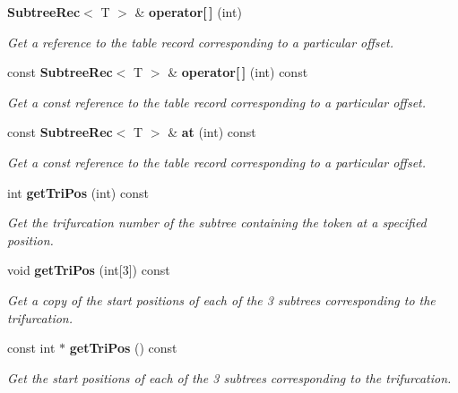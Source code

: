 \begin{CompactItemize}
{\bf Subtree\-Rec}$<$ T $>$ \& {\bf operator[$\,$]} (int)
\begin{CompactList}\small\item\em Get a reference to the table record corresponding to a particular offset. \item\end{CompactList}\item 
const {\bf Subtree\-Rec}$<$ T $>$ \& {\bf operator[$\,$]} (int) const 
\begin{CompactList}\small\item\em Get a const reference to the table record corresponding to a particular offset. \item\end{CompactList}\item 
const {\bf Subtree\-Rec}$<$ T $>$ \& {\bf at} (int) const 
\begin{CompactList}\small\item\em Get a const reference to the table record corresponding to a particular offset. \item\end{CompactList}\item 
int {\bf get\-Tri\-Pos} (int) const 
\begin{CompactList}\small\item\em Get the trifurcation number of the subtree containing the token at a specified position. \item\end{CompactList}\item 
void {\bf get\-Tri\-Pos} (int[3]) const 
\begin{CompactList}\small\item\em Get a copy of the start positions of each of the 3 subtrees corresponding to the trifurcation. \item\end{CompactList}\item 
const int $\ast$ {\bf get\-Tri\-Pos} () const 
\begin{CompactList}\small\item\em Get the start positions of each of the 3 subtrees corresponding to the trifurcation. \item\end{CompactList}\end{CompactItemize}
